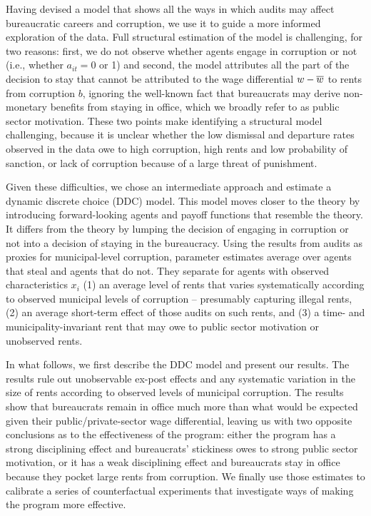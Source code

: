 {Having devised a model that shows all the ways in which audits may affect bureaucratic careers and corruption, we use it to guide a more informed exploration of the data. Full structural estimation of the model is challenging, for two reasons: first, we do not observe whether agents engage in corruption or not (i.e., whether $a_{it} = 0$ or 1) and second, the model attributes all the part of the decision to stay that cannot be attributed to the wage differential $w - \overline{w}$ to rents from corruption $b$, ignoring the well-known fact that bureaucrats may derive non-monetary benefits from staying in office, which we broadly refer to as public sector motivation. These two points make identifying a structural model challenging, because it is unclear whether the low dismissal and departure rates observed in the data owe to high corruption, high rents and low probability of sanction, or lack of corruption because of a large threat of punishment. 

Given these difficulties, we chose an intermediate approach and estimate a dynamic discrete choice (DDC) model. This model moves closer to the theory by introducing forward-looking agents and payoff functions that resemble the theory. It differs from the theory by lumping the decision of engaging in corruption or not into a decision of staying in the bureaucracy. Using the results from audits as proxies for municipal-level corruption, parameter estimates average over agents that steal and agents that do not. They separate for agents with observed characteristics $x_i$ (1) an average level of rents that varies systematically according to observed municipal levels of corruption -- presumably capturing illegal rents, (2) an average short-term effect of those audits on such rents, and (3) a time- and municipality-invariant rent that may owe to public sector motivation or unobserved rents. 

In what follows, we first describe the DDC model and present our results. The results rule out unobservable ex-post effects and any systematic variation in the size of rents according to observed levels of municipal corruption. The results show that bureaucrats remain in office much more than what would be expected given their public/private-sector wage differential, leaving us with two opposite conclusions as to the effectiveness of the program: either the program has a strong disciplining effect and bureaucrats' stickiness owes to strong public sector motivation, or it has a weak disciplining effect and bureaucrats stay in office because they pocket large rents from corruption. We finally use those estimates to calibrate a series of counterfactual experiments that investigate ways of making the program more effective. 

}
